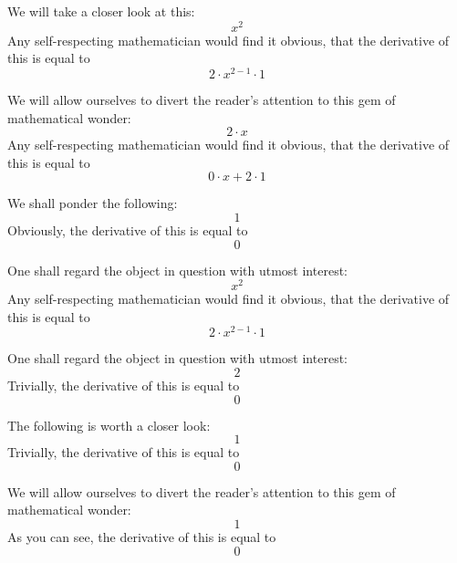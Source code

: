 \documentclass{article}
\begin{document}
We will take a closer look at this:
\begin{equation}
x ^{2 } 
\end{equation}
Any self-respecting mathematician would find it obvious, that the derivative of this is equal to
\begin{equation}
2 \cdot x ^{2 - 1 } \cdot 1 
\end{equation}

We will allow ourselves to divert the reader's attention to this gem of mathematical wonder:
\begin{equation}
2 \cdot x 
\end{equation}
Any self-respecting mathematician would find it obvious, that the derivative of this is equal to
\begin{equation}
0 \cdot x + 2 \cdot 1 
\end{equation}

We shall ponder the following:
\begin{equation}
1 
\end{equation}
Obviously, the derivative of this is equal to
\begin{equation}
0 
\end{equation}

One shall regard the object in question with utmost interest:
\begin{equation}
x ^{2 } 
\end{equation}
Any self-respecting mathematician would find it obvious, that the derivative of this is equal to
\begin{equation}
2 \cdot x ^{2 - 1 } \cdot 1 
\end{equation}

One shall regard the object in question with utmost interest:
\begin{equation}
2 
\end{equation}
Trivially, the derivative of this is equal to
\begin{equation}
0 
\end{equation}

The following is worth a closer look:
\begin{equation}
1 
\end{equation}
Trivially, the derivative of this is equal to
\begin{equation}
0 
\end{equation}

We will allow ourselves to divert the reader's attention to this gem of mathematical wonder:
\begin{equation}
1 
\end{equation}
As you can see, the derivative of this is equal to
\begin{equation}
0 
\end{equation}
\end{document}
